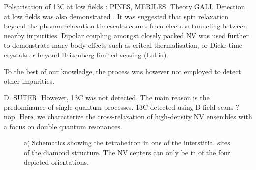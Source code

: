 \documentclass[preprintnumbers,amsmath,amssymb,twocolumn]{revtex4-1}
\begin{document}
Polsarisation of 13C at low fields : PINES, MERILES. 
Theory GALI.
Detection at low fields was also demonstrated \cite{van_oort_optically_1991, van_oort_cross-relaxation_1989, armstrong_nvnv_2010, jarmola_longitudinal_2015, akhmedzhanov_microwave-free_2017, akhmedzhanov_magnetometry_2019, holliday_optical_1989, choi_depolarization_2017}. It was suggested that spin relaxation beyond the phonon-relaxation timescales comes from electron tunneling between nearby impurities. 
Dipolar coupling amongst closely packed NV was used further to demonstrate many body effects such as critcal thermalisation, or Dicke time crystals or beyond Heisenberg limited sensing (Lukin).
 
To the best of our knowledge, the process was however not employed to detect other impurities. 


D. SUTER.
However, 13C was not detected. The main reason is the predominance of single-quantum processes.
13C detected using B field scans ? nop. 
Here, we characterize the cross-relaxation of high-density NV ensembles with a focus on double quantum resonances. 

\begin{figure}[!ht]
  \centering {}
  \caption{a) Schematics showing the tetrahedron in one of the interstitial sites of the diamond structure. The NV centers can only be in of the four depicted orientations. 
   }\label{Cristallo}
\end{figure}
\end{document}

